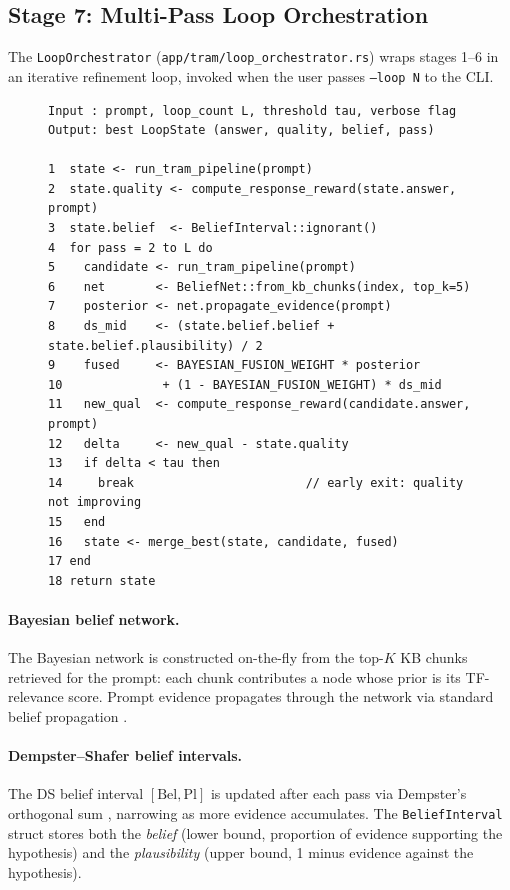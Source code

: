\documentclass[11pt,a4paper]{article}
\begin{document}
\subsection{Stage 7: Multi-Pass Loop Orchestration}
\label{sec:loop}

The \texttt{LoopOrchestrator} (\texttt{app/tram/loop\_orchestrator.rs}) wraps stages 1--6
in an iterative refinement loop, invoked when the user passes \texttt{--loop N} to the CLI.

\begin{figure}[H]
\begin{lstlisting}[style=pseudo, caption={Multi-pass loop orchestration}, label={alg:loop}]
Input : prompt, loop_count L, threshold tau, verbose flag
Output: best LoopState (answer, quality, belief, pass)

1  state <- run_tram_pipeline(prompt)
2  state.quality <- compute_response_reward(state.answer, prompt)
3  state.belief  <- BeliefInterval::ignorant()
4  for pass = 2 to L do
5    candidate <- run_tram_pipeline(prompt)
6    net       <- BeliefNet::from_kb_chunks(index, top_k=5)
7    posterior <- net.propagate_evidence(prompt)
8    ds_mid    <- (state.belief.belief + state.belief.plausibility) / 2
9    fused     <- BAYESIAN_FUSION_WEIGHT * posterior
10              + (1 - BAYESIAN_FUSION_WEIGHT) * ds_mid
11   new_qual  <- compute_response_reward(candidate.answer, prompt)
12   delta     <- new_qual - state.quality
13   if delta < tau then
14     break                        // early exit: quality not improving
15   end
16   state <- merge_best(state, candidate, fused)
17 end
18 return state
\end{lstlisting}
\end{figure}

\paragraph{Bayesian belief network.}
The Bayesian network is constructed on-the-fly from the top-$K$ KB chunks retrieved for the
prompt: each chunk contributes a node whose prior is its TF-relevance score. Prompt evidence
propagates through the network via standard belief propagation \citep{pearl1988probabilistic}.

\paragraph{Dempster--Shafer belief intervals.}
The DS belief interval $[\mathrm{Bel}, \mathrm{Pl}]$ is updated after each pass via
Dempster's orthogonal sum \citep{shafer1976mathematical}, narrowing as more evidence
accumulates. The \texttt{BeliefInterval} struct stores both the \emph{belief} (lower bound,
proportion of evidence supporting the hypothesis) and the \emph{plausibility} (upper bound,
1 minus evidence against the hypothesis).
\end{document}
